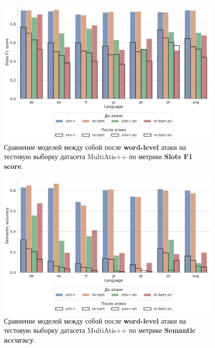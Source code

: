 \begin{figure}[h!]
    \centering
    \includegraphics[width=\textwidth]{images/4}
    \caption{Сравнение моделей между собой после \textbf{word-level} атаки на тестовую выборку датасета MultiAtis++ по метрике \textbf{Slots F1 score}.}\label{fig:figure4}
\end{figure}
\begin{figure}[h!]
    \centering
    \includegraphics[width=\textwidth]{images/5}
    \caption{Сравнение моделей между собой после \textbf{word-level} атаки на тестовую выборку датасета MultiAtis++ по метрике \textbf{Semantic accuracy}.}\label{fig:figure5}
\end{figure}

